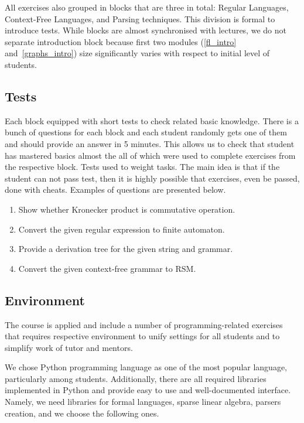 \documentclass[sigconf]{acmart}
\begin{document}
All exercises also grouped in blocks that are three in total: Regular Languages, Context-Free Languages, and Parsing techniques.
This division is formal to introduce tests.
While blocks are almost synchronised with lectures, we do not separate introduction block because first two modules (\ref{fl_intro} and~\ref{graphs_intro}) size significantly varies with respect to initial level of students.


\subsection{Tests}

Each block equipped with short tests to check related basic knowledge.
There is a bunch of questions for each block and each student randomly gets one of them and should provide an answer in 5 minutes. 
This allows us to check that student has mastered basics almost the all of which were used to complete exercises from the respective block.
Tests used to weight tasks.
The main idea is that if the student can not pass test, then it is highly possible that exercises, even be passed, done with cheats.
Examples of questions are presented below.
\begin{enumerate}
   \item Show whether Kronecker product is commutative operation. 
   \item Convert the given regular expression to finite automaton.
   \item Provide a derivation tree for the given string and grammar.
   \item Convert the given context-free grammar to RSM.
\end{enumerate}


\subsection{Environment}

The course is applied and include a number of programming-related exercises that requires respective environment to unify settings for all students and to simplify work of tutor and mentors.

We chose Python programming language as one of the most popular language, particularly among students.
Additionally, there are all required libraries implemented in Python and provide easy to use and well-documented interface.
Namely, we need libraries for formal languages, sparse linear algebra, parsers creation, and we choose the following ones.
\end{document}
